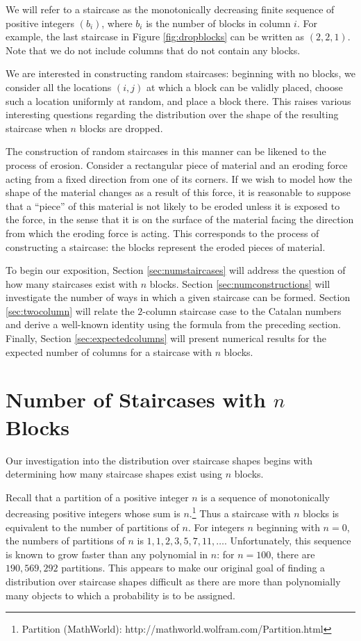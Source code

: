 \documentclass[12pt]{amsart}
\newcommand{\newsection}[2]{
\section{#1 \label{#2}}
}
\begin{document}
We will refer to a staircase as the monotonically decreasing finite sequence of positive integers $(b_i)$, where $b_i$ is the number of blocks in column $i$. For example, the last staircase in Figure \ref{fig:dropblocks} can be written as $(2,2,1)$. Note that we do not include columns that do not contain any blocks.

We are interested in constructing random staircases: beginning with no blocks, we consider all the locations $(i, j)$ at which a block can be validly placed, choose such a location uniformly at random, and place a block there. This raises various interesting questions regarding the distribution over the shape of the resulting staircase when $n$ blocks are dropped.

The construction of random staircases in this manner can be likened to the process of erosion. Consider a rectangular piece of material and an eroding force acting from a fixed direction from one of its corners. If we wish to model how the shape of the material changes as a result of this force, it is reasonable to suppose that a ``piece'' of this material is not likely to be eroded unless it is exposed to the force, in the sense that it is on the surface of the material facing the direction from which the eroding force is acting. This corresponds to the process of constructing a staircase: the blocks represent the eroded pieces of material.

To begin our exposition, Section \ref{sec:numstaircases} will address the question of how many staircases exist with $n$ blocks. Section \ref{sec:numconstructions} will investigate the number of ways in which a given staircase can be formed. Section \ref{sec:twocolumn} will relate the $2$-column staircase case to the Catalan numbers and derive a well-known identity using the formula from the preceding section. Finally, Section \ref{sec:expectedcolumns} will present numerical results for the expected number of columns for a staircase with $n$ blocks.

\newsection{Number of Staircases with $n$ Blocks}{sec:numstaircases}
Our investigation into the distribution over staircase shapes begins with determining how many staircase shapes exist using $n$ blocks.

Recall that a partition of a positive integer $n$ is a sequence of monotonically decreasing positive integers whose sum is $n$.\footnote{Partition (MathWorld): http://mathworld.wolfram.com/Partition.html} Thus a staircase with $n$ blocks is equivalent to the number of partitions of $n$. For integers $n$ beginning with $n = 0$, the numbers of partitions of $n$ is $1, 1, 2, 3, 5, 7, 11, \ldots$. Unfortunately, this sequence is known to grow faster than any polynomial in $n$: for $n = 100$, there are $190,569,292$ partitions. This appears to make our original goal of finding a distribution over staircase shapes difficult as there are more than polynomially many objects to which a probability is to be assigned.
\end{document}
